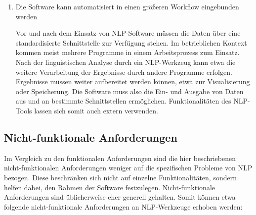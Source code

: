 \documentclass[12pt]{report}
\begin{document}
\begin{enumerate}
\item Die Software kann automatisiert in einen größeren Workflow eingebunden werden

Vor und nach dem Einsatz von NLP-Software müssen die Daten über eine standardisierte Schnittstelle zur Verfügung stehen. Im betrieblichen Kontext kommen meist mehrere Programme in einem Arbeitsprozess zum Einsatz. Nach der linguistischen Analyse durch ein NLP-Werkzeug kann etwa die weitere Verarbeitung der Ergebnisse durch andere Programme erfolgen. Ergebnisse müssen weiter aufbereitet werden können, etwa zur Visualisierung oder Speicherung. Die Software muss also die Ein- und Ausgabe von Daten aus und an bestimmte Schnittstellen ermöglichen. Funktionalitäten des NLP-Tools lassen sich somit auch extern verwenden. 
\end{enumerate}

\subsection{Nicht-funktionale Anforderungen}
Im Vergleich zu den funktionalen Anforderungen sind die hier beschriebenen nicht-funktionalen Anforderungen weniger auf die spezifischen Probleme von NLP bezogen. Diese beschränken sich nicht auf einzelne Funktionalitäten, sondern helfen dabei, den Rahmen der Software festzulegen. Nicht-funktionale Anforderungen sind üblicherweise eher generell gehalten. Somit können etwa folgende nicht-funktionale Anforderungen an NLP-Werkzeuge erhoben werden:
\end{document}
